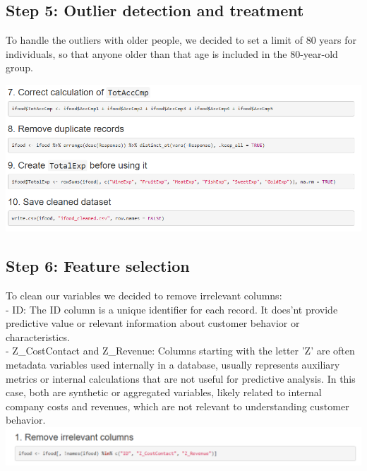 \documentclass[12pt,a4paper]{article}
\begin{document}
\subsection{Step 5: Outlier detection and treatment}
To handle the outliers with older people, we decided to set a limit of 80 years for individuals, so that anyone older than that age is included in the 80-year-old group.

\includegraphics[width=\textwidth]{Imatges/pre3.png}
\subsection{Step 6: Feature selection}
 To clean our variables we decided to remove irrelevant columns:\\
 - ID: The ID column is a unique identifier for each record. It does'nt provide predictive value or relevant information about customer behavior or characteristics.\\
 - Z\_CostContact and Z\_Revenue: Columns starting with the letter 'Z' are often metadata variables used internally in a database, usually represents auxiliary metrics or internal calculations that are not useful for predictive analysis. In this case, both are synthetic or aggregated variables, likely related to internal company costs and revenues, which are not relevant to understanding customer behavior. \\
 \includegraphics[width=\textwidth]{Imatges/pre8.png}
\end{document}
